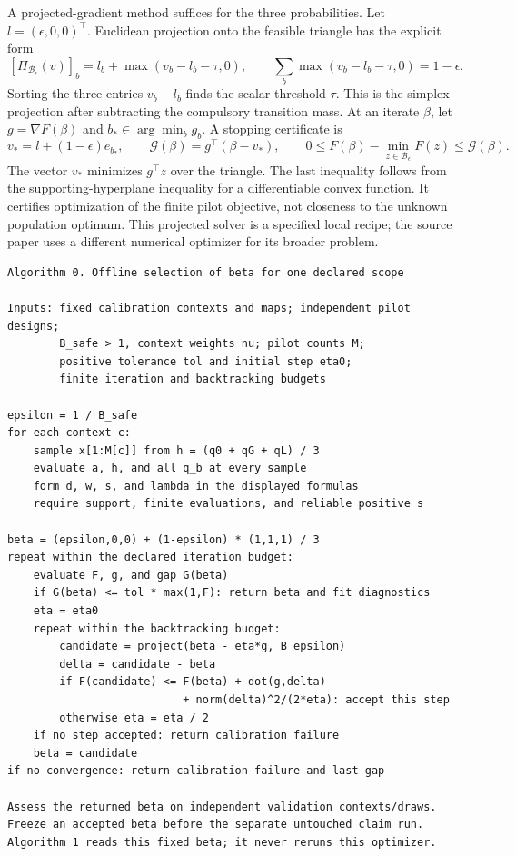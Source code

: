 A projected-gradient method suffices for the three probabilities. Let
\(l=(\epsilon,0,0)^\top\). Euclidean projection onto the feasible triangle
has the explicit form
\begin{equation}
\label{eq:bf-covariance-proposal-beta-projection}
 [\Pi_{\mathcal B_\epsilon}(v)]_b
   =l_b+\max(v_b-l_b-\tau,0),\qquad
 \sum_b\max(v_b-l_b-\tau,0)=1-\epsilon.
\end{equation}
Sorting the three entries \(v_b-l_b\) finds the scalar threshold \(\tau\).
This is the simplex projection after subtracting the compulsory transition
mass. At an iterate \(\beta\), let \(g=\nabla F(\beta)\) and
\(b_*\in\arg\min_b g_b\). A stopping certificate is
\begin{equation}
\label{eq:bf-covariance-proposal-beta-gap}
 v_*=l+(1-\epsilon)e_{b_*},\qquad
 \mathcal G(\beta)=g^\top(\beta-v_*),\qquad
 0\leq F(\beta)-\min_{z\in\mathcal B_\epsilon}F(z)
             \leq\mathcal G(\beta).
\end{equation}
The vector \(v_*\) minimizes \(g^\top z\) over the triangle. The last
inequality follows from the supporting-hyperplane inequality for a
differentiable convex function. It certifies optimization of the finite
pilot objective, not closeness to the unknown population optimum. This
projected solver is a specified local recipe; the source paper uses a
different numerical optimizer for its broader problem.

\begin{lstlisting}
Algorithm 0. Offline selection of beta for one declared scope

Inputs: fixed calibration contexts and maps; independent pilot designs;
        B_safe > 1, context weights nu; pilot counts M;
        positive tolerance tol and initial step eta0;
        finite iteration and backtracking budgets

epsilon = 1 / B_safe
for each context c:
    sample x[1:M[c]] from h = (q0 + qG + qL) / 3
    evaluate a, h, and all q_b at every sample
    form d, w, s, and lambda in the displayed formulas
    require support, finite evaluations, and reliable positive s

beta = (epsilon,0,0) + (1-epsilon) * (1,1,1) / 3
repeat within the declared iteration budget:
    evaluate F, g, and gap G(beta)
    if G(beta) <= tol * max(1,F): return beta and fit diagnostics
    eta = eta0
    repeat within the backtracking budget:
        candidate = project(beta - eta*g, B_epsilon)
        delta = candidate - beta
        if F(candidate) <= F(beta) + dot(g,delta)
                           + norm(delta)^2/(2*eta): accept this step
        otherwise eta = eta / 2
    if no step accepted: return calibration failure
    beta = candidate
if no convergence: return calibration failure and last gap

Assess the returned beta on independent validation contexts/draws.
Freeze an accepted beta before the separate untouched claim run.
Algorithm 1 reads this fixed beta; it never reruns this optimizer.
\end{lstlisting}

